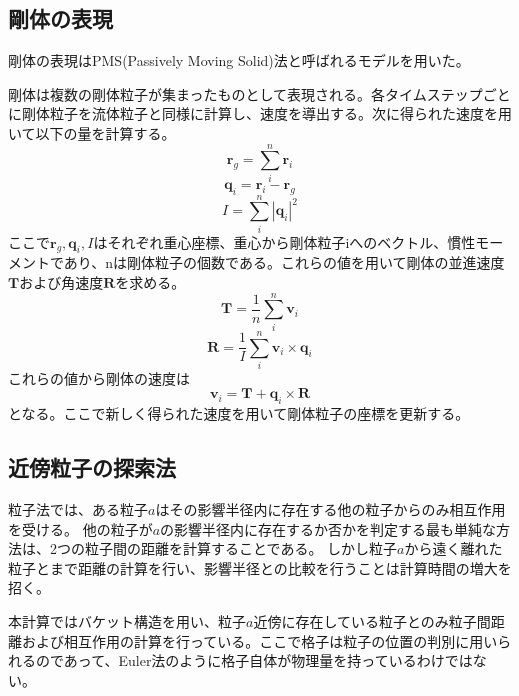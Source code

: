 \documentclass[]{jsarticle}
\begin{document}
\subsection{剛体の表現}
剛体の表現はPMS(Passively Moving Solid)法\cite{Gotoh2018}と呼ばれるモデルを用いた。

剛体は複数の剛体粒子が集まったものとして表現される。各タイムステップごとに剛体粒子を流体粒子と同様に計算し、速度を導出する。次に得られた速度を用いて以下の量を計算する。
\begin{equation}
  \bm{r}_g=\sum_{i}^n{\bm{r}_i}
\end{equation}
\begin{equation}
  \bm{q}_i=\bm{r}_i-\bm{r}_g
\end{equation}
\begin{equation}
  I=\sum_{i}^n{|\bm{q}_i|^2}
\end{equation}
ここで$\bm{r}_g,\bm{q}_i,I$はそれぞれ重心座標、重心から剛体粒子iへのベクトル、慣性モーメントであり、nは剛体粒子の個数である。これらの値を用いて剛体の並進速度$\bm{T}$および角速度$\bm{R}$を求める。
\begin{equation}
  \bm{T}=\frac{1}{n}\sum_{i}^n{\bm{v}_i}
\end{equation}
\begin{equation}
  \bm{R}=\frac{1}{I}\sum_{i}^n{\bm{v}_i\times\bm{q}_i}
\end{equation}
これらの値から剛体の速度は
\begin{equation}
\bm{v}_i=\bm{T}+\bm{q}_i\times\bm{R}
\end{equation}
となる。ここで新しく得られた速度を用いて剛体粒子の座標を更新する。

\subsection{近傍粒子の探索法}

粒子法では、ある粒子$a$はその影響半径内に存在する他の粒子からのみ相互作用を受ける。
他の粒子が$a$の影響半径内に存在するか否かを判定する最も単純な方法は、2つの粒子間の距離を計算することである。
しかし粒子$a$から遠く離れた粒子とまで距離の計算を行い、影響半径との比較を行うことは計算時間の増大を招く。

本計算ではバケット構造を用い、粒子$a$近傍に存在している粒子とのみ粒子間距離および相互作用の計算を行っている\cite{Koshiduka2014}。ここで格子は粒子の位置の判別に用いられるのであって、Euler法のように格子自体が物理量を持っているわけではない。
　
\end{document}
